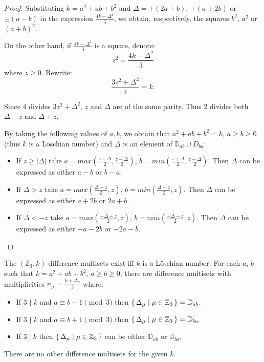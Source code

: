 \begin{proof}
	Substituting $k=a^2+ab+b^2$ and $\Delta=\pm (2a+b)$, $\pm (a+2b)$ or $\pm (a-b)$ in the expression $\frac{4k-\Delta^2}{3}$, we obtain, respectively, the squares $b^2$, $a^2$ or $(a+b)^2$.
	
	On the other hand, if $\frac{4k-\Delta^2}{3}$ is a square, denote:
	\begin{equation}
		z^2 = \frac{4k-\Delta^2}{3}
	\end{equation}
	where $z \geq 0$. Rewrite:
	\begin{equation}
		\frac{3z^2 + \Delta^2}{4} = k.
	\end{equation}
	
	Since $4$ divides $3z^2 + \Delta^2$, $z$ and $\Delta$ are of the same parity. Thus $2$ divides both $\Delta-z$ and $\Delta+z$.
	
	By taking the following values of $a,b$, we obtain that $a^2+ab+b^2=k$, $a \geq b \geq 0$ (thus $k$ is a Löschian number) and $\Delta$ is an element of $\mathbb D_{ab} \cup D_{ba}$:
	
	\begin{itemize}
		\item If $z \geq |\Delta|$ take $a=max(\frac{z+\Delta}2, \frac{z-\Delta}2)$, $b=min(\frac{z+\Delta}2, \frac{z-\Delta}2)$. Then $\Delta$ can be expressed as either $a-b$ or $b-a$.
		\item If $\Delta > z$ take $a=max(\frac{\Delta-z}{2}, z)$, $b=min(\frac{\Delta-z}{2}, z)$. Then $\Delta$ can be expressed as either $a+2b$ or $2a+b$.
		\item If $\Delta < -z$ take $a=max(\frac{-\Delta-z}2, z)$, $b=min(\frac{-\Delta-z}2, z)$. Then $\Delta$ can be expressed as either $-a-2b$ or $-2a-b$.
	\end{itemize}
	
\end{proof}

\begin{theorem}
	\label{v3:theorem:loeschian}
	The $(\mathbb Z_3,k)$-difference multisets exist iff $k$ is a Löschian number. For each $a$, $b$ such that $k=a^2+ab+b^2$, $a \geq b \geq 0$, there are difference multisets with multiplicities $n_\mu=\frac{k+\Delta_\mu}3$ where:
	
	\begin{itemize}
        \item If $3 \nmid k$ and $a \equiv b-1 \pmod 3$ then $\set{\Delta_\mu | \mu \in \mathbb Z_3}=\mathbb D_{ab}$.
        \item If $3 \nmid k$ and $a \equiv b+1 \pmod 3$ then $\set{\Delta_\mu | \mu \in \mathbb Z_3}=\mathbb D_{ba}$.
        \item If $3 \mid k$ then $\set{\Delta_\mu | \mu \in \mathbb Z_3}$ can be either $\mathbb D_{ab}$ or $\mathbb D_{ba}$.
	\end{itemize}
There are no other difference multisets for the given $k$.
\end{theorem}

